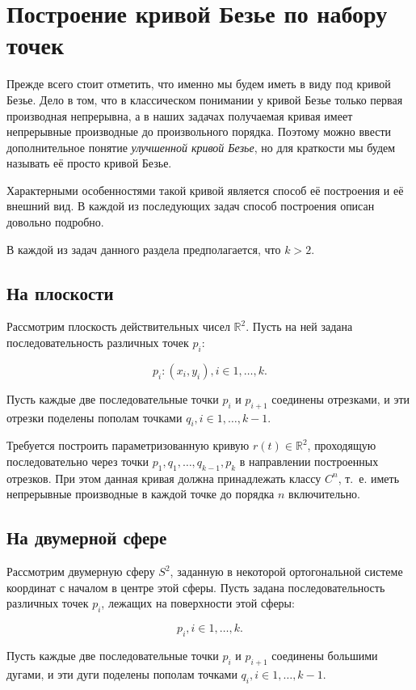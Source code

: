 \section{Построение кривой Безье по набору точек}

Прежде всего стоит отметить, что именно мы будем иметь в виду под кривой Безье. Дело в том, что в классическом
понимании у кривой Безье только первая производная непрерывна, а в наших задачах получаемая кривая имеет непрерывные
производные до произвольного порядка. Поэтому можно ввести дополнительное понятие \textit{улучшенной кривой Безье},
но для краткости мы будем называть её просто кривой Безье.

Характерными особенностями такой кривой является способ её построения и её внешний вид. В каждой из последующих задач
способ построения описан довольно подробно.

В каждой из задач данного раздела предполагается, что $k>2$.

\subsection*{На плоскости}

Рассмотрим плоскость действительных чисел $\mathbb{R}^2$. Пусть на ней задана последовательность различных точек $p_i$:

$${p_i: (x_i, y_i)}, i \in {1, \dots, k}.$$

Пусть каждые две последовательные точки $p_i$ и $p_{i+1}$ соединены отрезками, и эти отрезки поделены пополам точками
$q_i, i \in {1, \dots, k-1}$.

Требуется построить параметризованную кривую $r(t) \in \mathbb{R}^2$, проходящую последовательно через точки $p_1,
q_1, \dots, q_{k-1}, p_k$ в направлении построенных отрезков. При этом данная кривая должна принадлежать классу
$C^n$, т.~е. иметь непрерывные производные в каждой точке до порядка $n$ включительно.

\subsection*{На двумерной сфере}

Рассмотрим двумерную сферу $S^2$, заданную в некоторой ортогональной системе координат с началом в центре этой сферы.
Пусть задана последовательность различных точек $p_i$, лежащих на поверхности этой сферы:

$${p_i}, i \in {1, \dots, k}.$$

Пусть каждые две последовательные точки $p_i$ и $p_{i+1}$ соединены большими дугами, и эти дуги поделены пополам
точками $q_i, i \in {1, \dots, k-1}$.

